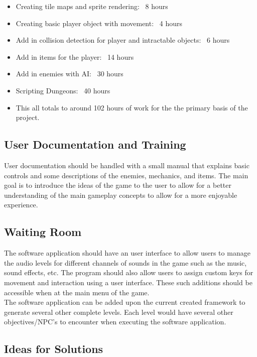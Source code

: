 \documentclass[12pt, titlepage]{article}
\begin{document}
\begin{itemize}
    \item Creating tile maps and sprite rendering: ~8 hours
    \item Creating basic player object with movement: ~4 hours
    \item Add in collision detection for player and intractable objects: ~6 hours
    \item Add in items for the player: ~14 hours
    \item Add in enemies with AI: ~30 hours
    \item Scripting Dungeons: ~40 hours
    \item This all totals to around 102 hours of work for the the primary basis of the project.
\end{itemize}

\subsection{User Documentation and Training}

User documentation should be handled with a small manual that explains basic controls and some descriptions of the enemies, mechanics, and items. The main goal is to introduce the ideas of the game to the user to allow for a better understanding of the main gameplay concepts to allow for a more enjoyable experience.

\newpage
\subsection{Waiting Room}

{\color{blue} The software application should have an user interface to allow users to manage the audio levels for different channels of sounds in the game such as the music, sound effects, etc. The program should also allow users to assign custom keys for movement and interaction using a user interface. These such additions should be accessible when at the main menu of the game.\\

The software application can be added upon the current created framework to generate several other complete levels. Each level would have several other objectives/NPC's to encounter when executing the software application. 

}

\subsection{Ideas for Solutions}
\end{document}
